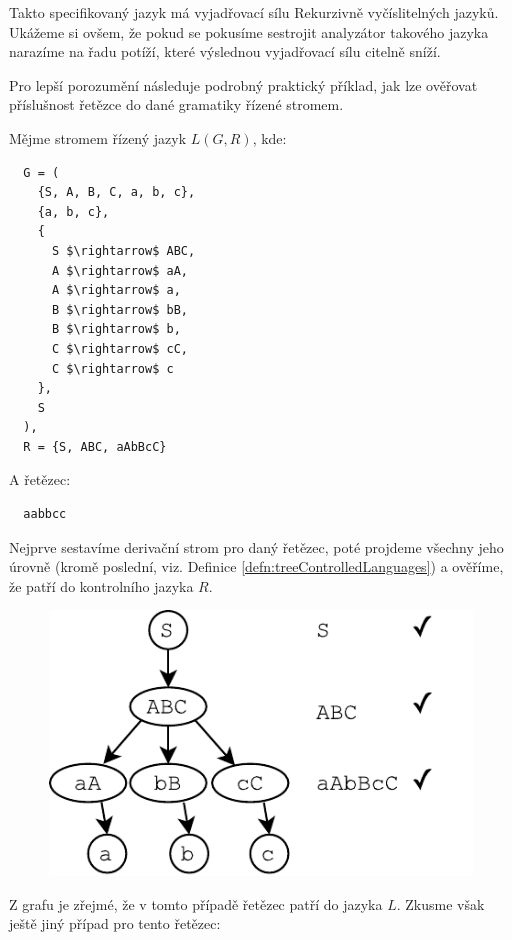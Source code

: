 \noindent
Takto specifikovaný jazyk má vyjadřovací sílu Rekurzivně vyčíslitelných jazyků.\cite{Koutny}
Ukážeme si ovšem, že pokud se pokusíme sestrojit analyzátor takového jazyka
narazíme na řadu potíží, které výslednou vyjadřovací sílu citelně sníží.

Pro lepší porozumění následuje podrobný praktický příklad, jak lze
ověřovat příslušnost řetězce do dané gramatiky řízené stromem.

\begin{exmp}
  \label{exmp:abc}
  Mějme stromem řízený jazyk $L(G, R)$, kde:
  \begin{lstlisting}
  G = (
    {S, A, B, C, a, b, c},
    {a, b, c},
    {
      S $\rightarrow$ ABC,
      A $\rightarrow$ aA,
      A $\rightarrow$ a,
      B $\rightarrow$ bB,
      B $\rightarrow$ b,
      C $\rightarrow$ cC,
      C $\rightarrow$ c
    },
    S
  ),
  R = {S, ABC, aAbBcC}
  \end{lstlisting}
  \noindent
  A řetězec:

  \begin{lstlisting}
  aabbcc
  \end{lstlisting}

  \noindent
  Nejprve sestavíme derivační strom pro daný řetězec, poté projdeme všechny
  jeho úrovně (kromě poslední, viz. Definice \ref{defn:treeControlledLanguages}) a
  ověříme, že patří do kontrolního jazyka $R$.

  \begin{figure}[H]
    \centering
    \includegraphics{fig/TreeControlledGrammar1.pdf}
  \end{figure}

  \noindent
  Z grafu je zřejmé, že v tomto případě řetězec patří do jazyka $L$.
  Zkusme však ještě jiný případ pro tento řetězec:


\end{exmp}
